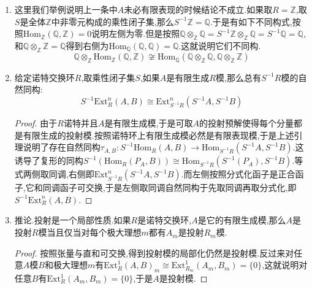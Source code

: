 \begin{enumerate}
\begin{proof}
		再构造$\varphi_A$为,设$f:A\to B$是$R$模同态,设$s\in S$,定义$\varphi_A$把$f/s$映射为$f_s:a\mapsto f(a)/s$.换句话讲$\varphi_A$就是$R$双线性映射$S^{-1}R\times\mathrm{Hom}_R(A,B)\to\mathrm{Hom}_R(A,S^{-1}B)$为$(r/s,f)\mapsto rf_s$所诱导的$R$模同态$S^{-1}\mathrm{Hom}_R(A,B)=S^{-1}R\otimes_R\mathrm{Hom}_R(A,B)\to\mathrm{Hom}_R(A,S^{-1}B)$.如果$A$是有限生成自由模那么$\varphi_A$是同构.现在对于一般的有限表示模$A$,选取正合列$R^t\to R^n\to A\to0$,有如下交换图表,按照局部化是正合函子,以及$Hom(-,B)$是左正合的,得到这两行都是正合列,按照$\varphi_{R^n}$和$\varphi_{R^t}$都是同构,得到$\varphi_A$是同构.容易验证$\varphi_A$的自然性.
		$$\xymatrix{0\ar[r]&S^{-1}\mathrm{Hom}_R(A,B)\ar[r]\ar[d]_{\varphi_A}&S^{-1}\mathrm{Hom}_R(R^n,B)\ar[r]\ar[d]_{\varphi_{R^n}}&S^{-1}\mathrm{Hom}_R(R^t,B)\ar[d]_{\varphi_{R^t}}\\0\ar[r]&\mathrm{Hom}_{R}(A,S^{-1}B)\ar[r]&\mathrm{Hom}_{R}(R^n,S^{-1}B)\ar[r]&\mathrm{Hom}_{R}(R^t,S^{-1}B)}$$
	\end{proof}
    \item 这里我们举例说明上一条中$A$未必有限表现的时候结论不成立.如果取$R=\mathbb{Z}$,取$S$是全体$\mathbb{Z}$中非零元构成的乘性闭子集,那么$S^{-1}\mathbb{Z}=\mathbb{Q}$.于是有如下不同构式,按照$\mathrm{Hom}_{\mathbb{Z}}(\mathbb{Q},\mathbb{Z})=0$说明左侧为零.但是按照$\mathbb{Q}\otimes_{\mathbb{Z}}\mathbb{Q}=S^{-1}\mathbb{Z}\otimes_{\mathbb{Z}}\mathbb{Q}=S^{-1}\mathbb{Q}=\mathbb{Q}$,和$\mathbb{Q}\otimes_{\mathbb{Z}}\mathbb{Z}=\mathbb{Q}$得到右侧为$\mathrm{Hom}_{\mathbb{Q}}(\mathbb{Q},\mathbb{Q})=\mathbb{Q}$.这就说明它们不同构.
    $$\mathbb{Q}\otimes_{\mathbb{Z}}\mathrm{Hom}_{\mathbb{Z}}(\mathbb{Q},\mathbb{Z})\not\cong\mathrm{Hom}_{\mathbb{Q}}(\mathbb{Q}\otimes_{\mathbb{Z}}\mathbb{Q},\mathbb{Q}\otimes_{\mathbb{Z}}\mathbb{Z})$$
    \item 给定诺特交换环$R$,取乘性闭子集$S$,如果$A$是有限生成$R$模,那么总有$S^{-1}R$模的自然同构:
    $$S^{-1}\mathrm{Ext}_R^n(A,B)\cong\mathrm{Ext}_{S^{-1}R}^n(S^{-1}A,S^{-1}B)$$
    \begin{proof}
    	
    	由于$R$诺特并且$A$是有限生成模,于是可取$A$的投射预解使得每个分量都是有限生成的投射模.按照诺特环上有限生成模必然是有限表现模,于是上述引理说明了存在自然同构$\tau_{A,B}:S^{-1}\mathrm{Hom}_R(A,B)\to\mathrm{Hom}_{S^{-1}R}(S^{-1}A,S^{-1}B)$.这诱导了复形的同构$S^{-1}(\mathrm{Hom}_R(P_A,B))\cong\mathrm{Hom}_{S^{-1}R}(S^{-1}(P_A),S^{-1}B)$.等式两侧取同调,右侧即$\mathrm{Ext}_{S^{-1}R}^n(S^{-1}A,S^{-1}B)$.而左侧按照分式化函子是正合函子,它和同调函子可交换,于是左侧取同调自然同构于先取同调再取分式化,即$S^{-1}\mathrm{Ext}_R^n(A,B)$.
    \end{proof}
    \item 推论.投射是一个局部性质.如果$R$是诺特交换环,$A$是它的有限生成模,那么$A$是投射$R$模当且仅当对每个极大理想$m$都有$A_m$是投射$R_m$模.
    \begin{proof}
    	
    	按照张量与直和可交换,得到投射模的局部化仍然是投射模.反过来对任意$A$模$B$和极大理想$m$有$\mathrm{Ext}_R^1(A,B)_m\cong\mathrm{Ext}_{R_m}^1(A_m,B_m)=\{0\}$,这就说明对任意$B$有$\mathrm{Ext}_R^1(A_m,B_m)=\{0\}$,于是$A$是投射模.
    \end{proof}
\end{enumerate}
